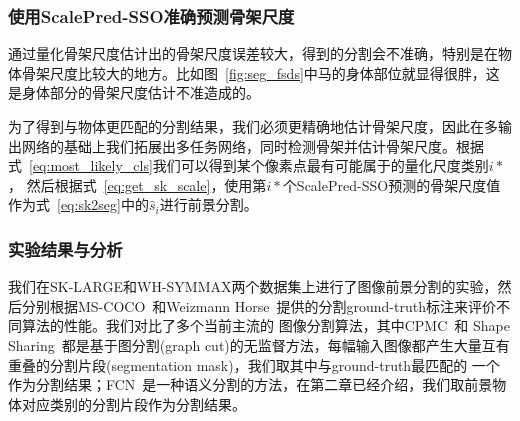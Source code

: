 \documentclass[UTF8]{ctexart}
\numberwithin{equation}{section} %
\numberwithin{table}{section} %
\begin{document}
\subsubsection{使用ScalePred-SSO准确预测骨架尺度}
通过量化骨架尺度估计出的骨架尺度误差较大，得到的分割会不准确，特别是在物体骨架尺度比较大的地方。比如图~\ref{fig:seg_fsds}中马的身体部位就显得很胖，这是身体部分的骨架尺度估计不准造成的。

为了得到与物体更匹配的分割结果，我们必须更精确地估计骨架尺度，因此在多输出网络的基础上我们拓展出多任务网络，同时检测骨架并估计骨架尺度。根据式~\ref{eq:most_likely_cls}我们可以得到某个像素点最有可能属于的量化尺度类别$i*$，
然后根据式~\ref{eq:get_sk_scale}，使用第$i*$个ScalePred-SSO预测的骨架尺度值作为式~\ref{eq:sk2seg}中的$\hat{s}_i$进行前景分割。

\subsubsection{实验结果与分析}
我们在SK-LARGE和WH-SYMMAX两个数据集上进行了图像前景分割的实验，然后分别根据MS-COCO~\cite{chen2015microsoft}和Weizmann Horse~\cite{borenstein2002class}提供的分割ground-truth标注来评价不同算法的性能。我们对比了多个当前主流的
图像分割算法，其中CPMC~\cite{carreira2010constrained}和 Shape Sharing~\cite{kim2012shape}都是基于图分割(graph cut)的无监督方法，每幅输入图像都产生大量互有重叠的分割片段(segmentation mask)，我们取其中与ground-truth最匹配的
一个作为分割结果；FCN~\cite{long2015fully}是一种语义分割的方法，在第二章已经介绍，我们取前景物体对应类别的分割片段作为分割结果。
\end{document}
